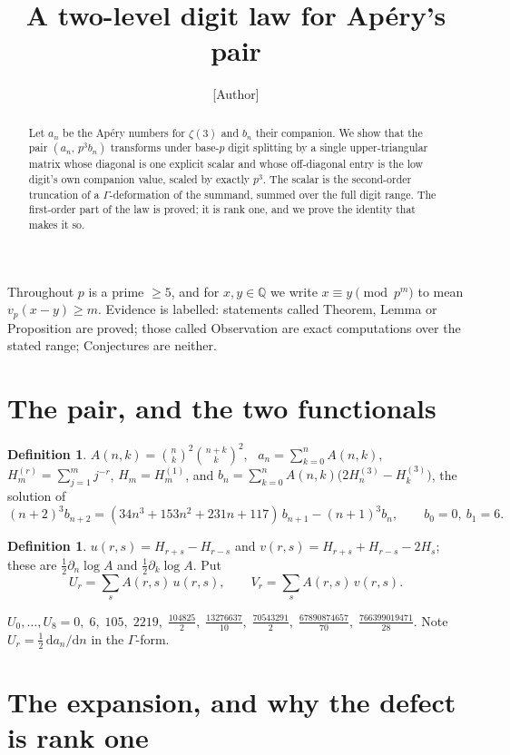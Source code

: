 \documentclass[11pt,a4paper]{amsart}
\title{A two-level digit law for Ap\'ery's pair}
\author{[Author]}
\date{}
\theoremstyle{plain}
\theoremstyle{definition}
\newtheorem{definition}[theorem]{Definition}
\theoremstyle{remark}
\newcommand{\QQ}{\mathbb{Q}}
\newcommand{\vp}{v_p}
\newcommand{\A}{A}
\begin{document}
\begin{abstract}
Let $a_n$ be the Ap\'ery numbers for $\zeta(3)$ and $b_n$ their companion. We show that
the pair $(a_n,\,p^3b_n)$ transforms under base-$p$ digit splitting by a single
upper-triangular matrix whose diagonal is one explicit scalar and whose off-diagonal
entry is the low digit's own companion value, scaled by exactly $p^{3}$. The scalar is
the second-order truncation of a $\Gamma$-deformation of the summand, summed over the
full digit range. The first-order part of the law is proved; it is rank one, and we
prove the identity that makes it so.
\end{abstract}
\maketitle

Throughout $p$ is a prime $\ge5$, and for $x,y\in\QQ$ we write $x\equiv y\pmod{p^m}$ to
mean $\vp(x-y)\ge m$. Evidence is labelled: statements called Theorem, Lemma or
Proposition are proved; those called Observation are exact computations over the stated
range; Conjectures are neither.

\section{The pair, and the two functionals}

\begin{definition}
$\A(n,k)=\binom nk^2\binom{n+k}k^2$, \ $a_n=\sum_{k=0}^n \A(n,k)$, \ $H^{(r)}_m=\sum_{j=1}^m j^{-r}$,
$H_m=H^{(1)}_m$, and $b_n=\sum_{k=0}^n \A(n,k)\bigl(2H^{(3)}_n-H^{(3)}_k\bigr)$, the solution of
\[
  (n+2)^3b_{n+2}=(34n^3+153n^2+231n+117)\,b_{n+1}-(n+1)^3b_n,\qquad b_0=0,\ b_1=6 .
\]
\end{definition}

\begin{definition}\label{def:uv}
$u(r,s)=H_{r+s}-H_{r-s}$ and $v(r,s)=H_{r+s}+H_{r-s}-2H_s$; these are
$\tfrac12\partial_n\log \A$ and $\tfrac12\partial_k\log \A$. Put
\[
  U_r=\sum_{s} \A(r,s)\,u(r,s),\qquad V_r=\sum_{s} \A(r,s)\,v(r,s).
\]
\end{definition}

$U_0,\dots,U_8=0,\;6,\;105,\;2219,\;\tfrac{104825}2,\;\tfrac{13276637}{10},\;
\tfrac{70543291}2,\;\tfrac{67890874657}{70},\;\tfrac{766399019471}{28}$.
Note $U_r=\tfrac12\,\mathrm{d}a_n/\mathrm{d}n$ in the $\Gamma$-form.

\section{The expansion, and why the defect is rank one}
\end{document}
